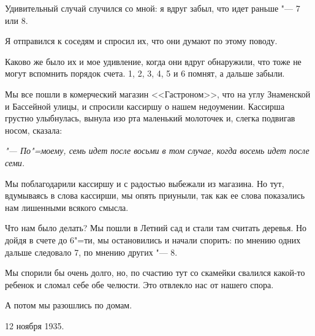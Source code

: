 Удивительный случай случился со мной:  я вдруг забыл, что идет раньше "--- 7 или 8.

Я отправился к соседям и спросил их, что они думают по этому поводу.

Каково же было их и мое удивление, когда они  вдруг  обнаружили,  что  тоже  не могут вспомнить порядок счета.  1, 2, 3, 4, 5 и 6  помнят, а дальше забыли.

Мы все пошли в комерческий магазин <<Гастроном>>, что на  углу Знаменской и Бассейной улицы, и спросили кассиршу о нашем  недоумении. Кассирша грустно улыбнулась, вынула изо рта маленький молоточек  и,  слегка подвигав носом, сказала:

\textit{"--- По"=моему, семь идет после восьми в том случае, когда восемь идет после семи.}

Мы поблагодарили кассиршу  и  с радостью выбежали из магазина.  Но тут,  вдумываясь в слова кассирши, мы опять приуныли,  так  как ее  слова показались нам  лишенными  всякого смысла.

Что нам было делать?  Мы  пошли в Летний сад и стали там считать деревья.  Но дойдя в счете до 6"=ти, мы остановились и начали спорить: по мнению одних дальше следовало 7, по мнению других "--- 8.

Мы спорили бы очень долго,  но, по  счастию тут со скамейки свалился какой-то ребенок и сломал себе обе челюсти. Это отвлекло нас от нашего спора.

А потом мы разошлись по домам.
\begin{flushright} 12 ноября 1935. \end{flushright}
